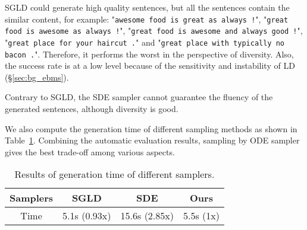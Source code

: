 \documentclass[11pt]{article}
\begin{document}
SGLD could generate high quality sentences, but all the sentences contain the similar content, for example: "\texttt{awesome food is great as always !}", "\texttt{great food is awesome as always !}", "\texttt{great food is awesome and always good !}", "\texttt{great place for your haircut .}" and "\texttt{great place with typically no bacon .}". Therefore, it performs the worst in the perspective of diversity. Also, the success rate is at a low level because of the sensitivity and instability of LD (\S\ref{sec:bg_ebms}).

Contrary to SGLD, the SDE sampler cannot guarantee the fluency of the generated sentences, although diversity is good.

We also compute the generation time of different sampling methods as shown in Table~\ref{tab:time_comsumed_sampler}. Combining the automatic evaluation results, sampling by ODE sampler gives the best trade-off among various aspects.

\begin{table}[ht]
    \centering
    \begin{tabular}{cccc}
    \toprule
    Samplers & SGLD & SDE & Ours \\\midrule
    Time & 5.1s (0.93x) & 15.6s (2.85x) & 5.5s (1x)\\\bottomrule
    \end{tabular}
    \caption{Results of generation time of different samplers.}
    \label{tab:time_comsumed_sampler}
\end{table}
\end{document}
